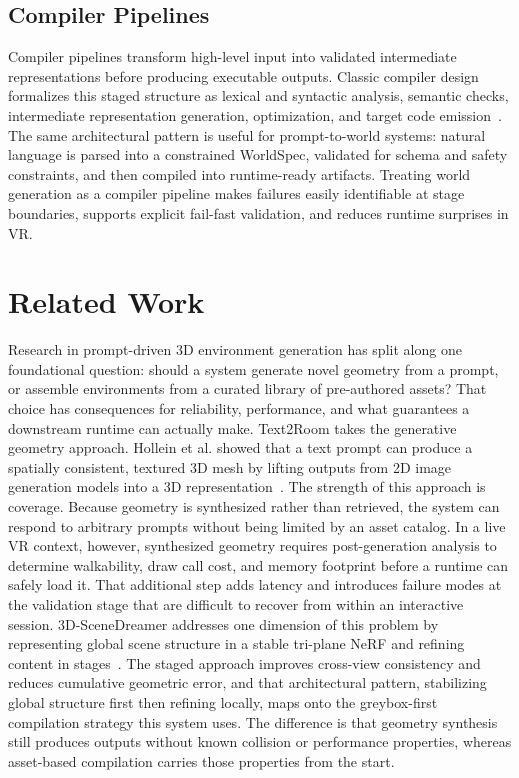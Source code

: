 \documentclass[12pt]{article}
\begin{document}
\subsection{Compiler Pipelines}
Compiler pipelines transform high-level input into validated intermediate representations before producing executable outputs. Classic compiler design formalizes this staged structure as lexical and syntactic analysis, semantic checks, intermediate representation generation, optimization, and target code emission~\cite{Aho_2006_Compilers}. The same architectural pattern is useful for prompt-to-world systems: natural language is parsed into a constrained WorldSpec, validated for schema and safety constraints, and then compiled into runtime-ready artifacts. Treating world generation as a compiler pipeline makes failures easily identifiable at stage boundaries, supports explicit fail-fast validation, and reduces runtime surprises in VR.

\section{Related Work}
Research in prompt-driven 3D environment generation has split along one foundational question: should a system generate novel geometry from a prompt, or assemble environments from a curated library of pre-authored assets? That choice has consequences for reliability, performance, and what guarantees a downstream runtime can actually make.
Text2Room takes the generative geometry approach. Hollein et al. showed that a text prompt can produce a spatially consistent, textured 3D mesh by lifting outputs from 2D image generation models into a 3D representation~\cite{hoellein2023text2room}. The strength of this approach is coverage. Because geometry is synthesized rather than retrieved, the system can respond to arbitrary prompts without being limited by an asset catalog. In a live VR context, however, synthesized geometry requires post-generation analysis to determine walkability, draw call cost, and memory footprint before a runtime can safely load it. That additional step adds latency and introduces failure modes at the validation stage that are difficult to recover from within an interactive session. 3D-SceneDreamer addresses one dimension of this problem by representing global scene structure in a stable tri-plane NeRF and refining content in stages~\cite{Zhang_2024_CVPR_SceneDreamer}. The staged approach improves cross-view consistency and reduces cumulative geometric error, and that architectural pattern, stabilizing global structure first then refining locally, maps onto the greybox-first compilation strategy this system uses. The difference is that geometry synthesis still produces outputs without known collision or performance properties, whereas asset-based compilation carries those properties from the start.
\end{document}
